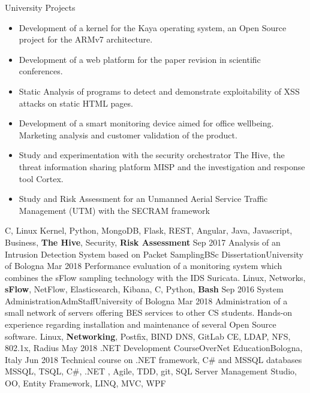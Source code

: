\begin{experiences}
  \experience
    {}   {University Projects}{}{}
    {} {
                  \begin{itemize}
                    \item Development of a kernel for the Kaya operating system, an Open Source project for the ARMv7 architecture.
                    \item Development of a web platform for the paper revision in scientific conferences.
                    \item Static Analysis of programs to detect and demonstrate exploitability of XSS attacks on static HTML pages.
                    \item Development of a smart monitoring device aimed for office wellbeing. Marketing analysis and customer validation of the product.
                    \item Study and experimentation with the security orchestrator The Hive, the threat information sharing platform MISP and the investigation and response tool Cortex.
                    \item Study and Risk Assessment for an Unmanned Aerial Service Traffic Management (UTM) with the SECRAM framework
                  \end{itemize}
                }
                  {C, Linux Kernel, Python, MongoDB, Flask, REST, Angular, Java, Javascript, Business, \textbf{The Hive}, Security, \textbf{Risk Assessment} }
\emptySeparator
  \experience
    {Sep 2017}   {Analysis of an Intrusion Detection System based on Packet Sampling}{BSc Dissertation}{University of Bologna}
    {Mar 2018} {
                      Performance evaluation of a monitoring system which combines the sFlow sampling technology with the IDS Suricata.
                    }
                    {Linux, Networks, \textbf{sFlow}, NetFlow, Elasticsearch, Kibana, C, Python, \textbf{Bash}}
  \emptySeparator
  \experience
    {Sep 2016}   {System Administration}{AdmStaff}{University of Bologna}
    {Mar 2018} {
                      Administration of a small network of servers offering BES services to other CS students. \linebreak
                      Hands-on experience regarding installation and maintenance of several Open Source software.
                    }
                    {Linux, \textbf{Networking}, Postfix, BIND DNS, GitLab CE, LDAP, NFS, 802.1x, Radius}
  \emptySeparator
  \experience
  {May 2018}   {.NET Development Course}{OverNet Education}{Bologna, Italy}
  {Jun 2018} {
                    Technical course on .NET framework, C\# and MSSQL databases
                  }
                  {MSSQL, TSQL, C\#, .NET , Agile, TDD, git, SQL Server Management Studio, OO, Entity Framework, LINQ, MVC, WPF}
  \emptySeparator
\end{experiences}
